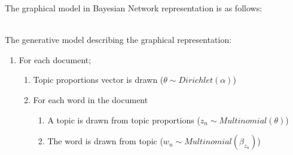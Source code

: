 \documentclass{article}%
\begin{document}
The graphical model in Bayesian Network representation is as follows:
\begin{figure}[h]
	\end{figure}
\\The generative model describing the graphical representation:
	\begin{enumerate}
		\item For each document;
		\begin{enumerate}
			\item Topic proportions vector is drawn ($\theta \sim Dirichlet(\alpha)$)
			\item For each word in the document
			\begin{enumerate}
				\item A topic is drawn from topic proportions ($z_n \sim Multinomial(\theta)$)
				\item The word is drawn from topic ($w_n \sim Multinomial(\beta_{z_n})$)
			\end{enumerate}
		\end{enumerate}
	\end{enumerate}
\end{document}
